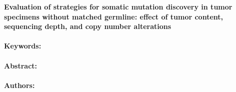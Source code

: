 \noindent
\large {\bf Evaluation of strategies for somatic mutation discovery in tumor specimens without matched germline: effect of tumor content, sequencing depth, and copy number alterations} 


\normalsize 


\noindent \paragraph{Keywords:} 

\noindent \paragraph{Abstract:} 



\noindent \paragraph{Authors:} 

